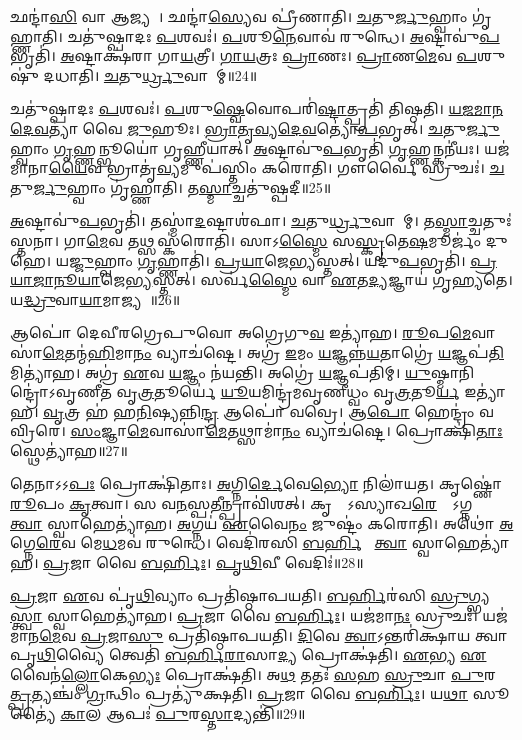 𑌛𑌨𑍍𑌦𑌾॑\ul{𑌸𑌿} 𑌵𑌾 𑌆𑌜𑍍𑌯𑌮𑍍᳚।
𑌛𑌨𑍍𑌦𑌾॑\ul{𑌸𑍍𑌯𑍇}𑌵 𑌪𑍍𑌰𑍀॑𑌣𑌾𑌤𑌿।
\ul{𑌚}𑌤𑍁\ul{𑌰𑍍𑌜𑍁}𑌹𑍍𑌵𑌾𑌂 𑌗𑍃॑𑌹𑍍𑌣𑌾𑌤𑌿।
𑌚𑌤𑍁॑𑌷𑍍𑌪𑌾𑌦𑌃 \ul{𑌪}𑌶𑌵𑌃॑।
\ul{𑌪}𑌶𑍂\ul{𑌨𑍇}𑌵𑌾𑌵॑ 𑌰𑍁𑌨𑍍𑌧𑍇।
\ul{𑌅}𑌷𑍍𑌟𑌾𑌵𑍁॑\ul{𑌪}𑌭𑍃𑌤𑌿॑।
\ul{𑌅}𑌷𑍍𑌟𑌾𑌕𑍍𑌷॑𑌰𑌾 𑌗𑌾\ul{𑌯}𑌤𑍍𑌰𑍀।
\ul{𑌗𑌾}\ul{𑌯}𑌤𑍍𑌰𑌃 \ul{𑌪𑍍𑌰𑌾}𑌣𑌃।
\ul{𑌪𑍍𑌰𑌾}𑌣\ul{𑌮𑍇}𑌵 \ul{𑌪}𑌶𑍁𑌷𑍁॑ 𑌦𑌧𑌾𑌤𑌿।
\ul{𑌚}𑌤𑍁\ul{𑌰𑍍𑌧𑍍𑌰𑍁}𑌵𑌾𑌯𑌾᳚𑌮𑍍॥24॥

𑌚𑌤𑍁॑𑌷𑍍𑌪𑌾𑌦𑌃 \ul{𑌪}𑌶𑌵𑌃॑।
\ul{𑌪}𑌶𑍁\ul{𑌷𑍍𑌵𑍇}𑌵𑍋𑌪𑌰𑌿॑\ul{𑌷𑍍𑌟𑌾}𑌤𑍍𑌪𑍍𑌰𑌤𑌿॑ 𑌤𑌿𑌷𑍍𑌠𑌤𑌿।
\ul{𑌯}\ul{𑌜}\ul{𑌮𑌾}\ul{𑌨}\ul{𑌦𑍇}\ul{𑌵}𑌤𑍍𑌯𑌾॑ 𑌵𑍈 \ul{𑌜𑍁}𑌹𑍂𑌃।
\ul{𑌭𑍍𑌰𑌾}\ul{𑌤𑍃}\ul{𑌵𑍍𑌯}\ul{𑌦𑍇}\ul{𑌵}𑌤𑍍𑌯𑍋॑\ul{𑌪}𑌭𑍃𑌤𑍍।
\ul{𑌚}𑌤𑍁\ul{𑌰𑍍𑌜𑍁}𑌹𑍍𑌵𑌾𑌂 \ul{𑌗𑍃}𑌹𑍍𑌣𑌨𑍍𑌭𑍂𑌯𑍋॑ 𑌗𑍃𑌹𑍍𑌣𑍀𑌯𑌾𑌤𑍍।
\ul{𑌅}𑌷𑍍𑌟𑌾𑌵𑍁॑\ul{𑌪}𑌭𑍃𑌤𑌿॑ \ul{𑌗𑍃}𑌹𑍍𑌣𑌨𑍍𑌕𑌨𑍀॑𑌯𑌃।
𑌯𑌜॑𑌮𑌾𑌨𑌾\ul{𑌯𑍈}𑌵 𑌭𑍍𑌰𑌾𑌤𑍃॑\ul{𑌵𑍍𑌯}𑌮𑍁𑌪॑𑌸𑍍𑌤𑌿𑌂 𑌕𑌰𑍋𑌤𑌿।
𑌗𑍗𑌰𑍍𑌵𑍈 𑌸𑍍𑌰𑍁𑌚𑌃॑।
\ul{𑌚}𑌤𑍁\ul{𑌰𑍍𑌜𑍁}𑌹𑍍𑌵𑌾𑌂 𑌗𑍃॑𑌹𑍍𑌣𑌾𑌤𑌿।
𑌤\ul{𑌸𑍍𑌮𑌾}𑌚𑍍𑌚𑌤𑍁॑𑌷𑍍𑌪𑌦𑍀॥25॥

\ul{𑌅}𑌷𑍍𑌟𑌾𑌵𑍁॑\ul{𑌪}𑌭𑍃𑌤𑌿॑।
𑌤𑌸𑍍𑌮𑌾॑\ul{𑌦}𑌷𑍍𑌟𑌾𑌶॑𑌫𑌾।
\ul{𑌚}𑌤𑍁\ul{𑌰𑍍𑌧𑍍𑌰𑍁}𑌵𑌾𑌯𑌾᳚𑌮𑍍।
𑌤\ul{𑌸𑍍𑌮𑌾}𑌚𑍍𑌚𑌤𑍁𑌃॑ 𑌸𑍍𑌤𑌨𑌾।
𑌗𑌾\ul{𑌮𑍇}𑌵 𑌤𑌥𑍍𑌸𑌸𑍍𑌕॑𑌰𑍋𑌤𑌿।
𑌸𑌾𑌽\ul{𑌸𑍍𑌮𑍈} 𑌸\ul{𑌸𑍍𑌕𑍃}𑌤𑍇\ul{𑌷}𑌮𑍂𑌰𑍍𑌜𑌂॑ 𑌦𑍁𑌹𑍇।
𑌯\ul{𑌜𑍍𑌜𑍁}𑌹𑍍𑌵𑌾𑌂 \ul{𑌗𑍃}𑌹𑍍𑌣𑌾𑌤𑌿॑।
\ul{𑌪𑍍𑌰}\ul{𑌯𑌾}𑌜𑍇\ul{𑌭𑍍𑌯}𑌸𑍍𑌤𑌤𑍍।
𑌯𑌦𑍁॑\ul{𑌪}𑌭𑍃𑌤𑌿॑।
\ul{𑌪𑍍𑌰}\ul{𑌯𑌾}\ul{𑌜𑌾}\ul{𑌨𑍂}\ul{𑌯𑌾}𑌜𑍇\ul{𑌭𑍍𑌯}𑌸𑍍𑌤𑌤𑍍।
𑌸𑌰𑍍𑌵॑\ul{𑌸𑍍𑌮𑍈} 𑌵𑌾 \ul{𑌏}𑌤\ul{𑌦𑍍𑌯}𑌜𑍍𑌞𑌾𑌯॑ 𑌗𑍃𑌹𑍍𑌯𑌤𑍇।
𑌯\ul{𑌦𑍍𑌧𑍍𑌰𑍁}𑌵𑌾\ul{𑌯𑌾}𑌮𑌾𑌜𑍍𑌯𑌮𑍍᳚॥26॥\anuvakamend[\ul{𑌅}\ul{𑌭𑌿}\ul{𑌘𑌾}𑌰𑌯॑𑌤𑌿 𑌗𑍃𑌹𑍍𑌣𑌾𑌤𑌿 \ul{𑌧𑍍𑌰𑍁}𑌵𑌾\ul{𑌯𑌾𑌂} 𑌚𑌤𑍁॑𑌷𑍍𑌪𑌦𑍀 𑌪𑍍𑌰𑌯𑌾𑌜𑌾𑌨𑍂\ul{𑌯𑌾}𑌜𑍇\ul{𑌭𑍍𑌯}𑌸𑍍𑌤𑌦𑍍𑌦𑍍𑌵𑍇 𑌚॑]

𑌆𑌪𑍋॑ 𑌦𑍇𑌵𑍀𑌰𑌗𑍍𑌰𑍇𑌪𑍁𑌵𑍋 𑌅𑌗𑍍𑌰𑍇𑌗𑍁\ul{𑌵} 𑌇𑌤𑍍𑌯𑌾॑𑌹।
\ul{𑌰𑍂}𑌪\ul{𑌮𑍇}𑌵𑌾𑌸𑌾॑\ul{𑌮𑍇}𑌤𑌨𑍍𑌮॑\ul{𑌹𑌿}\-𑌮𑌾\ul{𑌨𑌂} 𑌵𑍍𑌯𑌾𑌚॑𑌷𑍍𑌟𑍇।
𑌅𑌗𑍍𑌰॑ \ul{𑌇}𑌮𑌂 \ul{𑌯}𑌜𑍍𑌞𑌨𑍍𑌨॑\ul{𑌯}𑌤𑌾𑌗𑍍𑌰𑍇॑ \ul{𑌯}𑌜𑍍𑌞𑌪॑\ul{𑌤𑌿}𑌮𑌿𑌤𑍍𑌯𑌾॑𑌹।
𑌅𑌗𑍍𑌰॑ \ul{𑌏}𑌵 \ul{𑌯}𑌜𑍍𑌞𑌂 𑌨॑𑌯𑌨𑍍𑌤𑌿।
𑌅𑌗𑍍𑌰𑍇॑ \ul{𑌯}𑌜𑍍𑌞𑌪॑𑌤𑌿𑌮𑍍।
\ul{𑌯𑍁}𑌷𑍍𑌮𑌾𑌨𑌿𑌨𑍍𑌦𑍍𑌰𑍋॑\-𑌽𑌵𑍃𑌣𑍀𑌤 𑌵𑍃\ul{𑌤𑍍𑌰}𑌤𑍂𑌰𑍍𑌯𑍇॑ \ul{𑌯𑍂}𑌯𑌮𑌿𑌨𑍍𑌦𑍍𑌰॑𑌮𑌵𑍃𑌣𑍀𑌧𑍍𑌵𑌂 𑌵𑍃\ul{𑌤𑍍𑌰}𑌤𑍂\ul{𑌰𑍍𑌯} 𑌇𑌤𑍍𑌯𑌾॑𑌹।
\ul{𑌵𑍃}𑌤𑍍𑌰 𑌹॑ 𑌹\ul{𑌨𑌿}𑌷𑍍𑌯𑌨𑍍𑌨𑌿\ul{𑌨𑍍𑌦𑍍𑌰} 𑌆𑌪𑍋॑ 𑌵𑌵𑍍𑌰𑍇।
𑌆\ul{𑌪𑍋} 𑌹𑍇𑌨𑍍𑌦𑍍𑌰𑌂॑ 𑌵𑌵𑍍𑌰𑌿𑌰𑍇।
\ul{𑌸𑌂}𑌜𑍍𑌞𑌾\ul{𑌮𑍇}𑌵𑌾𑌸𑌾॑\ul{𑌮𑍇}𑌤𑌥𑍍𑌸𑌾𑌮𑌾॑\ul{𑌨𑌂} 𑌵𑍍𑌯𑌾𑌚॑𑌷𑍍𑌟𑍇।
𑌪𑍍𑌰𑍋𑌕𑍍𑌷𑌿॑\ul{𑌤𑌾𑌃} 𑌸𑍍𑌥𑍇𑌤𑍍𑌯𑌾॑𑌹॥27॥

𑌤𑍇𑌨𑌾𑌽𑌽\ul{𑌪𑌃} 𑌪𑍍𑌰𑍋𑌕𑍍𑌷𑌿॑𑌤𑌾𑌃।
\ul{𑌅}𑌗𑍍𑌨𑌿\ul{𑌰𑍍𑌦𑍇}𑌵𑍇\ul{𑌭𑍍𑌯𑍋} 𑌨𑌿𑌲𑌾॑𑌯𑌤।
𑌕𑍃𑌷𑍍𑌣𑍋॑ \ul{𑌰𑍂}𑌪𑌂 \ul{𑌕𑍃}𑌤𑍍𑌵𑌾।
𑌸 𑌵\ul{𑌨}𑌸𑍍𑌪\ul{𑌤𑍀}𑌨𑍍𑌪𑍍𑌰𑌾𑌵𑌿॑𑌶𑌤𑍍।
𑌕𑍃𑌷𑍍𑌣𑍋᳚\-𑌽𑌸𑍍𑌯𑌾𑌖\ul{𑌰𑍇}𑌷𑍍𑌠𑍋᳚\-𑌽𑌗𑍍𑌨𑌯𑍇᳚ \ul{𑌤𑍍𑌵𑌾} 𑌸𑍍𑌵𑌾𑌹𑍇𑌤𑍍𑌯𑌾॑𑌹।
\ul{𑌅}𑌗𑍍𑌨𑌯॑ \ul{𑌏}𑌵𑍈\ul{𑌨𑌂} 𑌜𑍁𑌷𑍍𑌟𑌂॑ 𑌕𑌰𑍋𑌤𑌿।
𑌅𑌥𑍋॑ \ul{𑌅}𑌗𑍍𑌨𑍇\ul{𑌰𑍇}𑌵 𑌮𑍇\ul{𑌧}𑌮𑌵॑ 𑌰𑍁𑌨𑍍𑌧𑍇।
𑌵𑍇𑌦𑌿॑𑌰𑌸𑌿 \ul{𑌬}\ul{𑌰𑍍}𑌹𑌿𑌷𑍇᳚ \ul{𑌤𑍍𑌵𑌾} 𑌸𑍍𑌵𑌾𑌹𑍇𑌤𑍍𑌯𑌾॑𑌹।
\ul{𑌪𑍍𑌰}𑌜𑌾 𑌵𑍈 \ul{𑌬}\ul{𑌰𑍍}𑌹𑌿𑌃।
\ul{𑌪𑍃}\ul{𑌥𑌿}𑌵𑍀 𑌵𑍇𑌦𑌿𑌃॑॥28॥

\ul{𑌪𑍍𑌰}𑌜𑌾 \ul{𑌏}𑌵 𑌪𑍃॑\ul{𑌥𑌿}𑌵𑍍𑌯𑌾𑌂 𑌪𑍍𑌰𑌤𑌿॑\-𑌷𑍍𑌠𑌾𑌪𑌯𑌤𑌿।
\ul{𑌬}\ul{𑌰𑍍}𑌹𑌿𑌰॑𑌸𑌿 \ul{𑌸𑍍𑌰𑍁}𑌗𑍍𑌭𑍍𑌯\ul{𑌸𑍍𑌤𑍍𑌵𑌾} 𑌸𑍍𑌵𑌾𑌹𑍇𑌤𑍍𑌯𑌾॑𑌹।
\ul{𑌪𑍍𑌰}𑌜𑌾 𑌵𑍈 \ul{𑌬}\ul{𑌰𑍍}𑌹𑌿𑌃।
𑌯𑌜॑𑌮𑌾\ul{𑌨𑌃} 𑌸𑍍𑌰𑍁𑌚𑌃॑।
𑌯𑌜॑𑌮𑌾𑌨\ul{𑌮𑍇}𑌵 \ul{𑌪𑍍𑌰}𑌜𑌾\ul{𑌸𑍁} 𑌪𑍍𑌰𑌤𑌿॑\-𑌷𑍍𑌠𑌾𑌪𑌯𑌤𑌿।
\ul{𑌦𑌿}𑌵𑍇 \ul{𑌤𑍍𑌵𑌾}\-𑌽𑌨𑍍𑌤𑌰𑌿॑𑌕𑍍𑌷𑌾𑌯 𑌤𑍍𑌵𑌾 𑌪𑍃\ul{𑌥𑌿}𑌵𑍍𑌯𑍈 𑌤𑍍𑌵𑍇𑌤𑌿॑ \ul{𑌬}\ul{𑌰𑍍}𑌹𑌿\ul{𑌰𑌾}𑌸𑌾\ul{𑌦𑍍𑌯} 𑌪𑍍𑌰𑍋𑌕𑍍𑌷॑𑌤𑌿।
\ul{𑌏}𑌭𑍍𑌯 \ul{𑌏}𑌵𑍈𑌨॑\ul{𑌲𑍍𑌲𑍋}𑌕𑍇\ul{𑌭𑍍𑌯𑌃} 𑌪𑍍𑌰𑍋𑌕𑍍𑌷॑𑌤𑌿।
𑌅\ul{𑌥} 𑌤𑌤𑌃॑ \ul{𑌸}𑌹 \ul{𑌸𑍍𑌰𑍁}𑌚𑌾 \ul{𑌪𑍁}𑌰𑌸𑍍𑌤𑌾᳚\ul{𑌤𑍍𑌪𑍍𑌰}𑌤𑍍𑌯𑌞𑍍𑌚𑌂॑ \ul{𑌗𑍍𑌰}𑌨𑍍𑌥𑌿𑌂 𑌪𑍍𑌰𑌤𑍍𑌯𑍁॑𑌕𑍍𑌷𑌤𑌿।
\ul{𑌪𑍍𑌰}𑌜𑌾 𑌵𑍈 \ul{𑌬}\ul{𑌰𑍍}𑌹𑌿𑌃।
𑌯\ul{𑌥𑌾} 𑌸𑍂𑌤𑍍𑌯𑍈॑ \ul{𑌕𑌾}𑌲 𑌆𑌪𑌃॑ \ul{𑌪𑍁}𑌰\ul{𑌸𑍍𑌤𑌾}𑌦𑍍𑌯𑌨𑍍𑌤𑌿॑॥29॥

